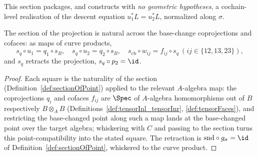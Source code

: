 This section packages, and constructs with \emph{no geometric hypotheses}, a cochain-level
realisation of the descent equation \(u_1^{*} L = u_2^{*} L\), normalized along \(\sigma\).

\begin{lemma}
  \label{lem:sectionSquares}
  \leanok
  The section of the projection is natural across the base-change coprojections and cofaces: as
  maps of curve products,
  \[
    s_q \circ u_1 = q_1 \circ s_B, \quad s_q \circ u_2 = q_2 \circ s_B, \quad
    s_{\mathrm{cb}} \circ w_{ij} = f_{ij} \circ s_q \ (ij \in \{12,13,23\}),
  \]
  and \(s_q\) retracts the projection, \(s_q \circ p_2 = \id\).
\end{lemma}
\begin{proof}
  \leanok
  Each square is the naturality of the section (Definition~\ref{def:sectionOfPoint}) applied to
  the relevant \(A\)-algebra map: the coprojections \(q_i\) and cofaces \(f_{ij}\) are
  \(\Spec\) of \(A\)-algebra homomorphisms out of \(B\) respectively \(B \otimes_A B\)
  (Definitions~\ref{def:tensorInl_tensorInr}, \ref{def:tensorFaces}), and restricting the
  base-changed point along such a map lands at the base-changed point over the target algebra;
  whiskering with \(C\) and passing to the section turns this point-compatibility into the stated
  square. The retraction is \(\mathrm{snd} \circ g_\sigma = \id\) of
  Definition~\ref{def:sectionOfPoint}, whiskered to the curve product.
\end{proof}

